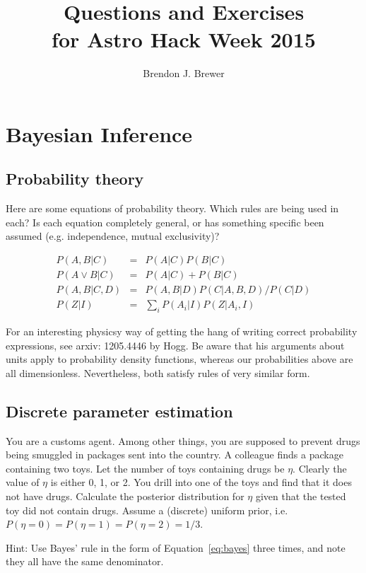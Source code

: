 \documentclass[a4paper, 11pt]{article}
\title{Questions and Exercises\\
for Astro Hack Week 2015}
\author{Brendon J. Brewer}
\begin{document}
\maketitle

\section{Bayesian Inference}


\subsection{Probability theory}
Here are some equations of probability theory. Which rules are being used in
each? Is each equation completely general, or has something specific been
assumed (e.g. independence, mutual exclusivity)?

\begin{eqnarray}
P(A, B | C) &=& P(A | C) P (B | C)\\
P(A \vee B | C) &=& P(A | C) + P(B | C)\\
P(A, B | C, D) &=& P(A, B | D)P(C | A, B, D)/P(C | D)\\
P(Z | I) &=& \sum_i P(A_i | I)P(Z | A_i, I)
\end{eqnarray}

For an interesting physicsy way of getting the hang of writing correct
probability expressions, see arxiv: 1205.4446 by Hogg. Be aware that his
arguments about units apply to probability density functions, whereas
our probabilities above are all dimensionless. Nevertheless, both satisfy rules
of very similar form.


\subsection{Discrete parameter estimation}
You are a customs agent. Among other things, you are supposed to prevent
drugs being smuggled in packages sent into the country. A colleague finds a
package containing two toys. Let the number of toys containing drugs be
$\eta$. Clearly the value of $\eta$ is either 0, 1, or 2. You drill into
one of the toys and find that it does not have drugs.
Calculate the posterior distribution for $\eta$ given that the tested
toy did not contain drugs. Assume a (discrete) uniform prior, i.e.
$P(\eta=0) = P(\eta=1) = P(\eta=2) = 1/3$.

{\tiny Hint: Use Bayes' rule in the form of Equation~\ref{eq:bayes}
three times, and note they all have the same denominator.}
\end{document}
